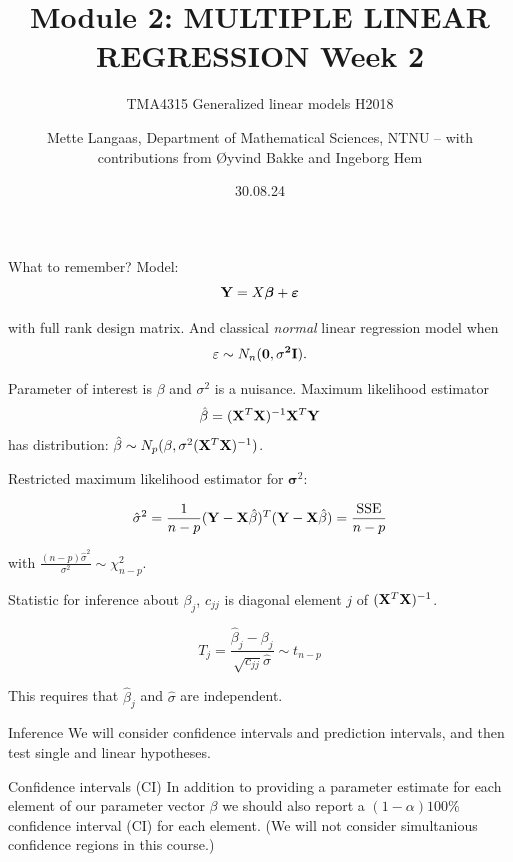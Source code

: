 \documentclass[
  ignorenonframetext,
]{beamer}
\title{Module 2: MULTIPLE LINEAR REGRESSION Week 2}
\subtitle{TMA4315 Generalized linear models H2018}
\author{Mette Langaas, Department of Mathematical Sciences, NTNU -- with
contributions from Øyvind Bakke and Ingeborg Hem}
\date{30.08.24}
\begin{document}
\frame{\titlepage}

\begin{frame}
\begin{block}{What to remember?}
\label{what-to-remember}
Model: \[
{\bf Y}= X {\boldsymbol \beta}+\boldsymbol{\varepsilon}
\]

with full rank design matrix. And classical \emph{normal} linear
regression model when \[\varepsilon\sim N_n(\bf{0},\sigma^2\bf{I}).\]

Parameter of interest is \(\beta\) and \(\sigma^2\) is a nuisance.
Maximum likelihood estimator
\[ \hat\beta=({\bf X}^T{\bf X})^{-1} {\bf X}^T {\bf Y}\] has
distribution:
\(\hat{\beta}\sim N_{p}(\beta,\sigma^2({\bf X}^T{\bf X})^{-1})\).

Restricted maximum likelihood estimator for \({\boldsymbol \sigma}^2\):

\[
\hat{\sigma}^2=\frac{1}{n-p}({\bf Y}-{\bf X}\hat{\beta})^T({\bf Y}-{\bf X}\hat{\beta})=\frac{\text{SSE}}{n-p}
\]

with \(\frac{(n-p)\hat{\sigma}^2}{\sigma^2} \sim \chi^2_{n-p}\).
\end{block}
\end{frame}

\begin{frame}
Statistic for inference about \(\beta_j\), \(c_{jj}\) is diagonal
element \(j\) of \(({\bf X}^T{\bf X})^{-1}\).

\[
T_j=\frac{\hat{\beta}_j-\beta_j}{\sqrt{c_{jj}}\hat{\sigma}}\sim t_{n-p}
\]

This requires that \(\hat{\beta}_j\) and \(\hat{\sigma}\) are
independent.
\end{frame}

\begin{frame}{Inference}
\label{inference}
We will consider confidence intervals and prediction intervals, and then
test single and linear hypotheses.
\end{frame}

\begin{frame}
\begin{block}{Confidence intervals (CI)}
\label{confidence-intervals-ci}
In addition to providing a parameter estimate for each element of our
parameter vector \(\beta\) we should also report a \((1-\alpha)100\)\%
confidence interval (CI) for each element. (We will not consider
simultanious confidence regions in this course.)
\end{block}
\end{frame}
\end{document}
